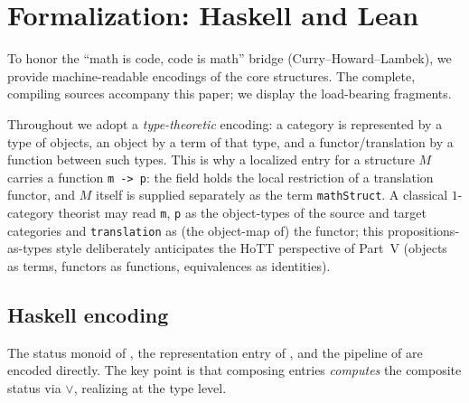 \documentclass[12pt]{article}
\theoremstyle{definition}
\theoremstyle{remark}
\begin{document}
\section{Formalization: Haskell and Lean}
\label{sec:code}

To honor the ``math is code, code is math'' bridge (Curry--Howard--Lambek), we
provide machine-readable encodings of the core structures. The complete,
compiling sources accompany this paper; we display the load-bearing fragments.

Throughout we adopt a \emph{type-theoretic} encoding: a category is represented
by a type of objects, an object by a term of that type, and a
functor/translation by a function between such types. This is why a localized
entry for a structure $M$ carries a function \texttt{m -> p}: the field holds the
local restriction of a translation functor, and $M$ itself is supplied
separately as the term \texttt{mathStruct}. A classical $1$-category theorist may
read \texttt{m}, \texttt{p} as the object-types of the source and target
categories and \texttt{translation} as (the object-map of) the functor; this
propositions-as-types style deliberately anticipates the HoTT perspective of
Part~V (objects as terms, functors as functions, equivalences as identities).

\subsection{Haskell encoding}

The status monoid of , the representation entry of
, and the pipeline of  are encoded directly.
The key point is that composing entries \emph{computes} the composite status via
$\vee$, realizing  at the type level.
\end{document}
